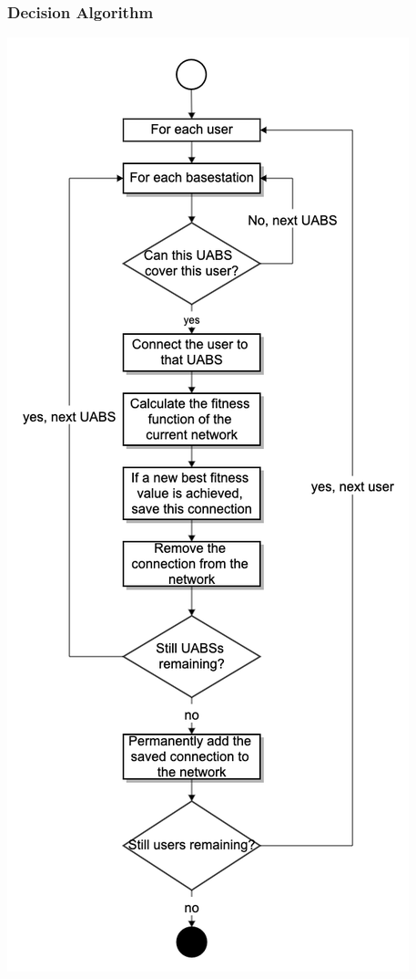 \subsubsection{Decision Algorithm}

\noindent
\begin{minipage}{0.6\textwidth}%
  \includegraphics[width=\textwidth]{../images/decisionAlgoFlowChart.png}
  \label{fig:decisionAlgoFlowChart}
\end{minipage}%
